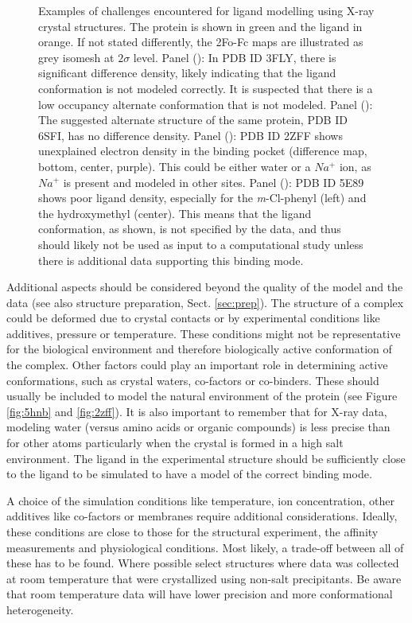 \documentclass[9pt,bestpractices]{livecoms}
\begin{document}
\begin{figure}
    \caption{Examples of challenges encountered for ligand modelling using X-ray crystal structures. The protein is shown in green and the ligand in orange. If not stated differently, the 2Fo-Fc maps are illustrated as grey isomesh at $2\sigma$ level. 
    Panel (): In PDB ID 3FLY, there is significant difference density, likely indicating that the ligand conformation is not modeled correctly.  It is suspected that there is a low occupancy alternate conformation that is not modeled.
    Panel (): The suggested alternate structure of the same protein, PDB ID 6SFI, has no difference density.
    Panel (): PDB ID 2ZFF shows unexplained electron density in the binding pocket (difference map, bottom, center, purple). This could
    be either water or a $Na^+$ ion, as $Na^+$ is present and modeled in other sites. 
    Panel (): PDB ID 5E89 shows poor ligand density, especially for the \textit{m}-Cl-phenyl (left) and the hydroxymethyl (center). This means that the ligand conformation, as shown, is not specified by the data, and thus should likely not be used as input to a computational study unless there is additional data supporting this binding mode.
    }
    \label{fig:crystal2}
\end{figure}

Additional aspects should be considered beyond the quality of the model and the data (see also structure preparation, Sect. \ref{sec:prep}).
%
The structure of a complex could be deformed due to crystal contacts
or by experimental conditions like additives, pressure or temperature. These conditions might not be representative for the biological environment and therefore biologically active conformation of the complex. 
%
Other factors could play an important role in determining  active conformations, such as crystal waters, co-factors or co-binders. These should usually be included to model the natural environment of the protein (see Figure \ref{fig:5hnb} and \ref{fig:2zff}). It is also important to remember that for X-ray data, modeling water (versus amino acids or organic compounds) is less precise than for other atoms particularly when the crystal is formed in a high salt environment.
%
The ligand in the experimental structure should be sufficiently close to the ligand to be simulated to have a model of the correct binding mode. 

A choice of the simulation conditions like temperature, ion concentration, other additives like co-factors or membranes require additional considerations. Ideally, these conditions are close to those for the structural experiment, the affinity measurements and physiological conditions. Most likely, a trade-off between all of these has to be found. Where possible select structures where data was collected at room temperature that were crystallized using non-salt precipitants. Be aware that room temperature data will have lower precision and more conformational heterogeneity.
    
\end{document}
